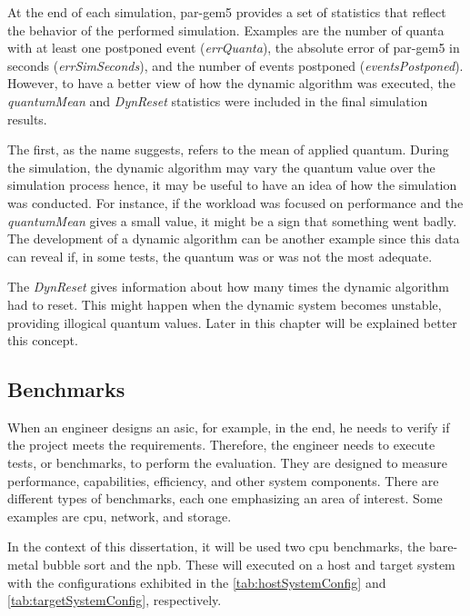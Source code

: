 At the end of each simulation, par-gem5 provides a set of statistics that reflect the behavior of the performed simulation. Examples are 
the number of quanta with at least one postponed event (\textit{errQuanta}), the absolute error of par-gem5 in seconds (\textit{errSimSeconds}), 
and the number of events postponed (\textit{eventsPostponed}). However, to have a better view of how the dynamic algorithm was executed, 
the \textit{quantumMean} and \textit{DynReset} statistics were included in the final simulation results. 

The first, as the name suggests, refers to the mean of applied quantum. During the simulation, the dynamic algorithm may vary the quantum 
value over the simulation process hence, it may be useful to have an idea of how the simulation was conducted. For instance, if the workload was 
focused on performance and the \textit{quantumMean} gives a small value, it might be a sign that something went badly. The development of a 
dynamic algorithm can be another example since this data can reveal if, in some tests, the quantum was or was not the most adequate.

The \textit{DynReset} gives information about how many times the dynamic algorithm had to reset. This might happen when the dynamic system 
becomes unstable, providing illogical quantum values. Later in this chapter will be explained better this concept. 


\subsection{Benchmarks}
\label{cap:BM}

When an engineer designs an \gls{asic}, for example, in the end, he needs to verify if the project meets the requirements. Therefore, the engineer 
needs to execute tests, or benchmarks, to perform the evaluation. They are designed to measure performance, capabilities, efficiency, 
and other system components. There are different types of benchmarks, each one emphasizing an area of interest. 
Some examples are \gls{cpu}, network, and storage. 

In the context of this dissertation, it will be used two \gls{cpu} benchmarks, the bare-metal bubble sort and the \gls{npb}. These will 
executed on a host and target system with the configurations exhibited in the \autoref{tab:hostSystemConfig} and \autoref{tab:targetSystemConfig}, 
respectively.
\newline

